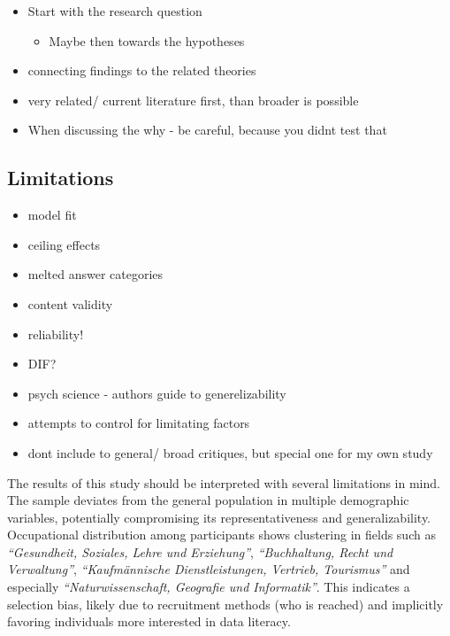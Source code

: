 \documentclass[
  12pt,
  a4paper,
  twoside]{article}
\providecommand{\tightlist}{%
  \setlength{\itemsep}{0pt}\setlength{\parskip}{0pt}}
\begin{document}
\begin{itemize}
\tightlist
\item
  Start with the research question

  \begin{itemize}
  \tightlist
  \item
    Maybe then towards the hypotheses
  \end{itemize}
\item
  connecting findings to the related theories
\item
  very related/ current literature first, than broader is possible
\item
  When discussing the why - be careful, because you didnt test that
\end{itemize}

\subsection{Limitations}\label{limitations}

\begin{itemize}
\tightlist
\item
  model fit
\item
  ceiling effects
\item
  melted answer categories
\item
  content validity
\item
  reliability!
\item
  DIF?
\item
  psych science - authors guide to generelizability
\item
  attempts to control for limitating factors
\item
  dont include to general/ broad critiques, but special one for my own study
\end{itemize}

The results of this study should be interpreted with several limitations in mind. The sample deviates from the general population in multiple demographic variables, potentially compromising its representativeness and generalizability. Occupational distribution among participants shows clustering in fields such as \emph{``Gesundheit, Soziales, Lehre und Erziehung''}, \emph{``Buchhaltung, Recht und Verwaltung''}, \emph{``Kaufmännische Dienstleistungen, Vertrieb, Tourismus''} and especially \emph{``Naturwissenschaft, Geografie und Informatik''}. This indicates a selection bias, likely due to recruitment methods (who is reached) and implicitly favoring individuals more interested in data literacy.
\end{document}
